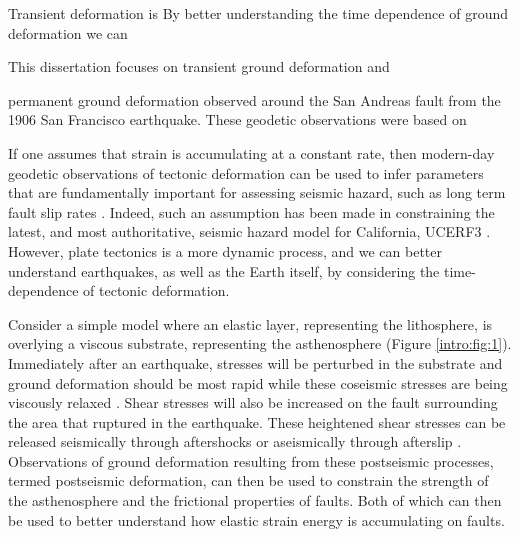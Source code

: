 Transient deformation is 
By better understanding the time
dependence of ground deformation we can

 This dissertation focuses on transient
ground deformation and

permanent ground
deformation observed around the San Andreas fault from the 1906 San
Francisco earthquake. These geodetic observations were based on 



If one assumes that strain is accumulating at a constant
rate, then modern-day geodetic observations of tectonic deformation
can be used to infer parameters that are fundamentally important for
assessing seismic hazard, such as long term fault slip rates
\citep[e.g.,][]{Savage1973,Meade2005}. Indeed, such an assumption has
been made in constraining the latest, and most authoritative, seismic
hazard model for California, UCERF3 \citep{Field2014}. However, plate
tectonics is a more dynamic process, and we can better understand
earthquakes, as well as the Earth itself, by considering the
time-dependence of tectonic deformation.

Consider a simple model where an elastic layer, representing the
lithosphere, is overlying a viscous substrate, representing the
asthenosphere (Figure \ref{intro:fig:1}). Immediately after an
earthquake, stresses will be perturbed in the substrate and ground
deformation should be most rapid while these coseismic stresses are
being viscously relaxed \citep{Nur1974,Savage1978}. Shear stresses
will also be increased on the fault surrounding the area that ruptured
in the earthquake. These heightened shear stresses can be released
seismically through aftershocks or aseismically through afterslip
\citep{Marone1991}. Observations of ground deformation resulting from
these postseismic processes, termed postseismic deformation, can then
be used to constrain the strength of the asthenosphere and the
frictional properties of faults. Both of which can then be used to
better understand how elastic strain energy is accumulating on faults.

